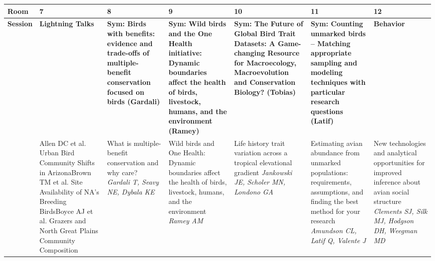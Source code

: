 \begin{tabular}{|x{0.75cm}|x{2.25cm}|a{2.25cm}|a{2.25cm}|a{2.25cm}|a{2.25cm}|x{2.25cm}|}\hline
Room & 7 & 8 & 9 & 10 & 11 & 12\\
\hline
\rule{0pt}{1em} \textbf{Session} &\footnotesize \textbf{Lightning Talks} & \footnotesize \textbf{Sym: Birds with benefits: evidence and trade-offs of multiple-benefit conservation focused on birds (Gardali)} & \footnotesize \textbf{Sym: Wild birds and the One Health initiative: Dynamic boundaries affect the health of birds, livestock, humans, and the environment (Ramey)} & \footnotesize \textbf{Sym: The Future of Global Bird Trait Datasets: A Game-changing Resource for Macroecology, Macroevolution and Conservation Biology? (Tobias)} & \footnotesize \textbf{Sym: Counting unmarked birds – Matching appropriate sampling and modeling techniques with particular research questions (Latif)} & \footnotesize \textbf{Behavior}\\
\hline
{}&\scriptsize Allen DC et al. \newline \tiny Urban Bird Community Shifts in Arizona\newline \newline \scriptsize Brown TM et al. \newline \tiny Site Availability of NA's Breeding Birds\newline \newline \scriptsize Boyce AJ et al. \newline \tiny Grazers and North Great Plains Community Composition & What is multiple-benefit conservation and why care? \newline \newline \textit{Gardali T, Seavy NE, Dybala KE} & Wild birds and One Health: Dynamic boundaries affect the health of birds, livestock, humans, and the environment \newline \newline \textit{Ramey AM} & Life history trait variation across a tropical elevational gradient \newline \newline \textit{Jankowski JE, Scholer MN, Londono GA} & Estimating avian abundance from unmarked populations: requirements, assumptions, and finding the best method for your research \newline \newline \textit{Amundson CL, Latif Q, Valente J} & New technologies and analytical opportunities for improved inference about avian social structure \newline \newline \textit{Clements SJ, Silk MJ, Hodgson DH, Weegman MD}\\

\end{tabular}
